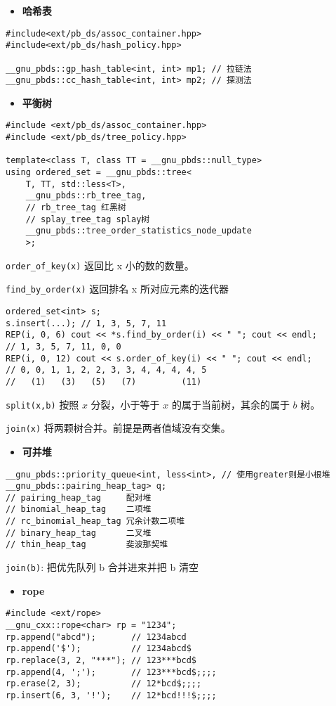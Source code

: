 \documentclass[a4paper,landscape,twocolumn]{ctexart}
\newcommand{\point}[1]{
	\begin{itemize}
		\item \textbf{#1}
	\end{itemize}
}
\begin{document}
\point{哈希表}

\begin{lstlisting}
#include<ext/pb_ds/assoc_container.hpp>
#include<ext/pb_ds/hash_policy.hpp>

__gnu_pbds::gp_hash_table<int, int> mp1; // 拉链法
__gnu_pbds::cc_hash_table<int, int> mp2; // 探测法
\end{lstlisting}

\point{平衡树}

\begin{lstlisting}
#include <ext/pb_ds/assoc_container.hpp>
#include <ext/pb_ds/tree_policy.hpp>

template<class T, class TT = __gnu_pbds::null_type>
using ordered_set = __gnu_pbds::tree<
	T, TT, std::less<T>,
	__gnu_pbds::rb_tree_tag,
	// rb_tree_tag 红黑树
	// splay_tree_tag splay树
	__gnu_pbds::tree_order_statistics_node_update
	>;
\end{lstlisting}

\texttt{order\_of\_key(x)}  返回比 x 小的数的数量。

\texttt{find\_by\_order(x)}  返回排名 x 所对应元素的迭代器

\begin{lstlisting}
ordered_set<int> s;
s.insert(...); // 1, 3, 5, 7, 11
REP(i, 0, 6) cout << *s.find_by_order(i) << " "; cout << endl;
// 1, 3, 5, 7, 11, 0, 0
REP(i, 0, 12) cout << s.order_of_key(i) << " "; cout << endl;
// 0, 0, 1, 1, 2, 2, 3, 3, 4, 4, 4, 4, 5
//   (1)   (3)   (5)   (7)         (11)
\end{lstlisting}

\texttt{split(x,b)} 按照 $x$ 分裂，小于等于 $x$ 的属于当前树，其余的属于 $b$ 树。

\texttt{join(x)} 将两颗树合并。前提是两者值域没有交集。

\point{可并堆}

\begin{lstlisting}
__gnu_pbds::priority_queue<int, less<int>, // 使用greater则是小根堆
__gnu_pbds::pairing_heap_tag> q;
// pairing_heap_tag     配对堆
// binomial_heap_tag    二项堆
// rc_binomial_heap_tag 冗余计数二项堆
// binary_heap_tag      二叉堆
// thin_heap_tag        斐波那契堆
\end{lstlisting}

\texttt{join(b)}: 把优先队列 b 合并进来并把 b 清空

\point{rope}

\begin{lstlisting}
#include <ext/rope>
__gnu_cxx::rope<char> rp = "1234";
rp.append("abcd");       // 1234abcd
rp.append('$');          // 1234abcd$
rp.replace(3, 2, "***"); // 123***bcd$
rp.append(4, ';');       // 123***bcd$;;;;
rp.erase(2, 3);          // 12*bcd$;;;;
rp.insert(6, 3, '!');    // 12*bcd!!!$;;;;
\end{lstlisting}
\end{document}
